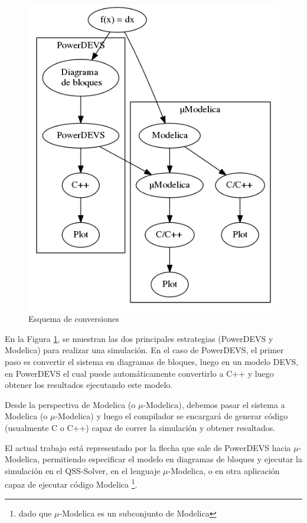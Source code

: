 \begin{figure}[H]
\centering
 \includegraphics[width=0.75\linewidth]{esquema}
 \caption{Esquema de conversiones}
 \label{fig:esquema}
\end{figure}

En la Figura \ref{fig:esquema}, se muestran las dos principales estrategias (PowerDEVS y Modelica) para realizar una simulación. En el caso de PowerDEVS, el primer paso es convertir el sistema en diagramas de bloques, luego en un modelo DEVS, en PowerDEVS el cual puede automáticamente convertirlo a C++ y luego obtener los resultados ejecutando este modelo. 

Desde la perspectiva de Modelica (o $\mu$-Modelica), debemos pasar el sistema a Modelica (o $\mu$-Modelica) y luego el compilador se encargará de generar código (usualmente C o C++) capaz de correr la simulación y obtener resultados.

El actual trabajo está representado por la flecha que sale de PowerDEVS hacia $\mu$-Modelica, permitiendo especificar el modelo en diagramas de bloques y ejecutar la simulación en el QSS-Solver, en el lenguaje $\mu$-Modelica, o en otra aplicación capaz de ejecutar código Modelica \footnote{dado que $\mu$-Modelica es un subconjunto de Modelica}.

